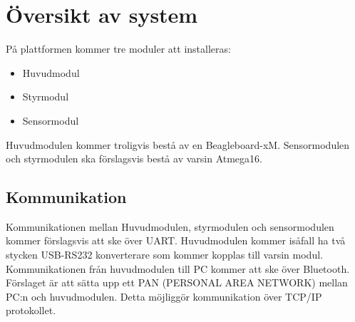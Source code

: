 \section{Översikt av system}
På plattformen kommer tre moduler att installeras:

\begin{itemize}
\item Huvudmodul
\item Styrmodul
\item Sensormodul
\end{itemize}
Huvudmodulen kommer troligvis bestå av en Beagleboard-xM. Sensormodulen och styrmodulen ska förslagsvis bestå av varsin Atmega16.
\subsection{Kommunikation}
Kommunikationen mellan Huvudmodulen, styrmodulen och sensormodulen kommer förslagsvis att ske över UART. Huvudmodulen kommer isåfall ha två stycken USB-RS232 konverterare som kommer kopplas till varsin modul. Kommunikationen från huvudmodulen till PC kommer att ske över Bluetooth. Förslaget är att sätta upp ett PAN (PERSONAL AREA NETWORK) mellan PC:n och huvudmodulen. Detta möjliggör kommunikation över TCP/IP protokollet.

